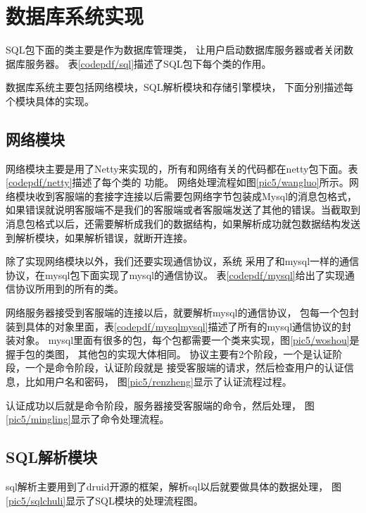 \section{数据库系统实现}
SQL包下面的类主要是作为数据库管理类，
让用户启动数据库服务器或者关闭数据库服务器。
表\ref{codepdf/sql}描述了SQL包下每个类的作用。

数据库系统主要包括网络模块，SQL解析模块和存储引擎模块，
下面分别描述每个模块具体的实现。
\subsection{网络模块}
网络模块主要是用了Netty来实现的，所有和网络有关的代码都在netty包下面。表\ref{codepdf/netty}描述了每个类的
功能。
网络处理流程如图\ref{pic5/wangluo}所示。网络模块收到客服端的套接字连接以后需要包网络字节包装成Mysql的消息包格式，如果错误就说明客服端不是我们的客服端或者客服端发送了其他的错误。当截取到消息包格式以后，还需要解析成我们的数据结构，如果解析成功就包数据结构发送到解析模块，如果解析错误，就断开连接。

除了实现网络模块以外，我们还要实现通信协议，系统
采用了和mysql一样的通信协议，在mysql包下面实现了mysql的通信协议。
表\ref{codepdf/mysql}给出了实现通信协议所用到的所有的类。

网络服务器接受到客服端的连接以后，就要解析mysql的通信协议，
包每一个包封装到具体的对象里面，表\ref{codepdf/mysqlmysql}描述了所有的mysql通信协议的封装对象。
mysql里面有很多的包，每个包都需要一个类来实现，图\ref{pic5/woshou}是握手包的类图，
其他包的实现大体相同。
协议主要有2个阶段，一个是认证阶段，一个是命令阶段，认证阶段就是
接受客服端的请求，然后检查用户的认证信息，比如用户名和密码，
图\ref{pic5/renzheng}显示了认证流程过程。

认证成功以后就是命令阶段，服务器接受客服端的命令，然后处理，
图\ref{pic5/mingling}显示了命令处理流程。
\subsection{SQL解析模块}
sql解析主要用到了druid开源的框架，解析sql以后就要做具体的数据处理，
图\ref{pic5/sqlchuli}显示了SQL模块的处理流程图。


